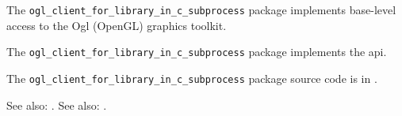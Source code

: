
The {\tt ogl\_client\_for\_library\_in\_c\_subprocess} package implements base-level access to the Ogl (OpenGL) graphics
toolkit.

The {\tt ogl\_client\_for\_library\_in\_c\_subprocess} package implements the  api.

The {\tt ogl\_client\_for\_library\_in\_c\_subprocess} package source code is in .

See also:  .
See also:  .


